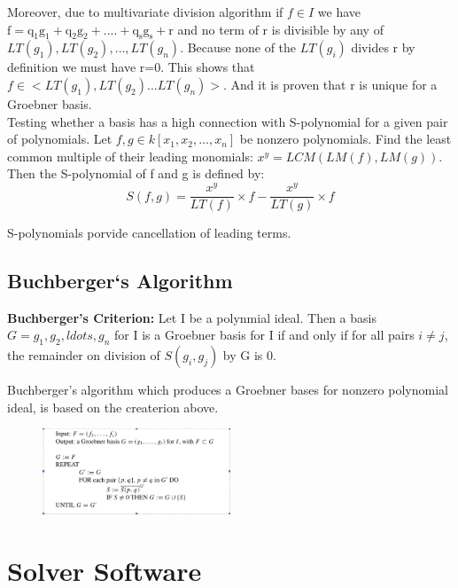 \documentclass[11pt]{article}
\begin{document}
Moreover, due to multivariate division algorithm if $f \in I$ we have $\mathrm{f=q_1g_1 + q_2g_2 + .... + q_sg_s + r}$
and no term of r is divisible by any of $LT(g_1),LT(g_2),\ldots,LT(g_n)$. Because none of the $LT(g_i)$ divides r by definition we must have r=0. This shows that $f \in <LT(g_1),LT(g_2) \ldots LT(g_n)>$. And it is proven that r is unique for a Groebner basis.\\

Testing whether a basis has a high connection with S-polynomial for a given pair of polynomials. Let $f,g \in k[x_1,x_2,\ldots,x_n]$ be nonzero polynomials. Find the least common multiple of their leading monomials: $x^y = LCM(LM(f),LM(g))$. Then the S-polynomial of f and g is defined by:
\begin{equation}
  S(f,g) = \frac{x^y}{LT(f)}\times{f} - \frac{x^y}{LT(g)}\times{f}
\end{equation}

S-polynomials porvide cancellation of leading terms.

\subsection{Buchberger`s Algorithm}
\textbf{Buchberger's Criterion:} Let I be a polynmial ideal. Then a basis $G = {g_1,g_2, ldots, g_n}$ for I is a Groebner basis for I if and only if for all pairs $i \neq j$, the remainder on division of $S(g_i,g_j)$ by G is 0.

Buchberger's algorithm which produces a Groebner bases for nonzero polynomial ideal, is based on the createrion above.

\begin{figure}[H]
  \begin{center}
    \includegraphics[width=0.50\textwidth]{Buchberger.jpg}
    \caption{}
    \label{fig: }
  \end{center}
\end{figure}


\section{Solver Software}
\end{document}
